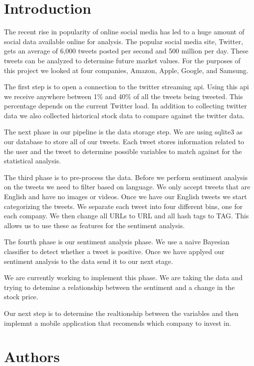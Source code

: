 \documentclass{acm_proc_article-sp}
\begin{document}
\section{Introduction}

The recent rise in popularity of online social media has led to a huge amount
of social data available online for analysis. The popular social media site,
Twitter, gets an average of 6,000 tweets posted per second and 500 million per
day. These tweets can be analyzed to determine future market values. For the
purposes of this project we looked at four companies, Amazon, Apple, Google,
and Samsung. 

The first step is to open a connection to the twitter streaming api. Using this
api we receive anywhere between 1\% and 40\% of all the tweets being tweeted.
This percentage depends on the current Twitter load. In addition to collecting
twitter data we also collected historical stock data to compare against the
twitter data.

The next phase in our pipeline is the data storage step. We are using sqlite3 as
our database to store all of our tweets. Each tweet stores information
related to the user and the tweet to determine possible variables to match
against for the statistical analysis.

The third phase is to pre-process the data. Before we perform sentiment
analysis on the tweets we need to filter based on language. We only accept
tweets that are English and have no images or videos. Once we have our English
tweets we start categorizing the tweets. We separate each tweet into four
different bins, one for each company. We then change all URLs to URL and all
hash tags to TAG. This allows us to use these as features for the sentiment
analysis. 

The fourth phase is our sentiment analysis phase. We use a naive Bayesian
classifier to detect whether a tweet is positive. Once we have applyed our
sentiment analysis to the data send it to our next stage.

We are currently working to implement this phase. We are taking the data and
trying to detemine a relationship between the sentiment and a change in the
stock price.

Our next step is to determine the realtionship between the variables and then
implemnt a mobile application that recomends which company to invest in. 

\section{Authors}
\end{document}
